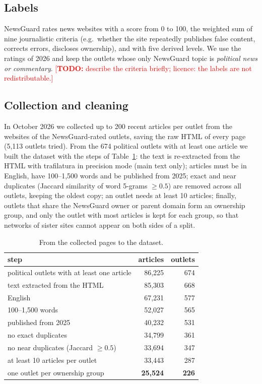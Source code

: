 \documentclass[11pt,a4paper]{article}
\newcommand{\todo}[1]{\textcolor{red}{[\textbf{TODO:} #1]}}
\begin{document}
\subsection{Labels}
NewsGuard \citep{newsguard} rates news websites with a score from 0 to 100, the weighted sum of nine journalistic
criteria (e.g.\ whether the site repeatedly publishes false content, corrects errors, discloses ownership), and with
five derived levels. We use the ratings of 2026 and keep the outlets whose only NewsGuard topic is
\emph{political news or commentary}. \todo{describe the criteria briefly; licence: the labels are not
redistributable.}

\subsection{Collection and cleaning}
In October 2026 we collected up to 200 recent articles per outlet from the websites of the NewsGuard-rated outlets,
saving the raw HTML of every page (5,113 outlets tried). From the 674 political outlets with at least one article we
built the dataset with the steps of Table~\ref{tab:cleaning}: the text is re-extracted from the HTML with trafilatura
\citep{barbaresi2021trafilatura} in precision mode (main text only); articles must be in English, have 100--1,500 words
and be published from 2025; exact and near duplicates (Jaccard similarity of word 5-grams $\geq 0.5$) are removed
across all outlets, keeping the oldest copy; an outlet needs at least 10 articles; finally, outlets that share the
NewsGuard owner or parent domain form an ownership group, and only the outlet with most articles is kept for each
group, so that networks of sister sites cannot appear on both sides of a split.

\begin{table}[t]
\centering
\caption{From the collected pages to the dataset.}\label{tab:cleaning}
\begin{tabular}{lrr}
\toprule
step & articles & outlets \\
\midrule
political outlets with at least one article & 86,225 & 674 \\
text extracted from the HTML & 85,303 & 668 \\
English & 67,231 & 577 \\
100--1,500 words & 52,027 & 565 \\
published from 2025 & 40,232 & 531 \\
no exact duplicates & 34,799 & 361 \\
no near duplicates (Jaccard $\geq 0.5$) & 33,694 & 347 \\
at least 10 articles per outlet & 33,443 & 287 \\
one outlet per ownership group & \textbf{25,524} & \textbf{226} \\
\bottomrule
\end{tabular}
\end{table}
\end{document}
